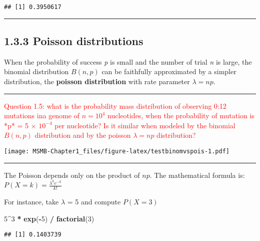 \documentclass[]{article}
\newenvironment{Shaded}{\begin{snugshade}}{\end{snugshade}}
\newcommand{\KeywordTok}[1]{\textcolor[rgb]{0.13,0.29,0.53}{\textbf{#1}}}
\newcommand{\DecValTok}[1]{\textcolor[rgb]{0.00,0.00,0.81}{#1}}
\newcommand{\StringTok}[1]{\textcolor[rgb]{0.31,0.60,0.02}{#1}}
\newcommand{\OperatorTok}[1]{\textcolor[rgb]{0.81,0.36,0.00}{\textbf{#1}}}
\newcommand{\NormalTok}[1]{#1}
\let\oldrule=\rule
\renewcommand{\rule}[1]{\oldrule{\linewidth}}
\begin{document}
\begin{verbatim}
## [1] 0.3950617
\end{verbatim}

\begin{center}\rule{0.5\linewidth}{\linethickness}\end{center}

\subsection{1.3.3 Poisson distributions}\label{poisson-distributions}

When the probability of success \emph{p} is small and the number of
trial \emph{n} is large, the binomial distribution \(B(n, p)\) can be
faithfully approximated by a simpler distribution, the \textbf{poisson
distribution} with rate parameter \(\lambda = np\).

\begin{center}\rule{0.5\linewidth}{\linethickness}\end{center}

\textcolor{red}{Question 1.5: what is the probability mass distribution of observing 0:12 mutations ina  genome of $n = 10^4$ nucleotides, when the probability of mutation is *p* = 5 $\times$ $10^{-4}$ per nucleotide? Is it similar when modeled by the binomial $B(n, p)$ distribution and by the poisson $\lambda = np$ distribution?}

\texttt{[image: MSMB-Chapter1\_files/figure-latex/testbinomvspois-1.pdf]}

\begin{center}\rule{0.5\linewidth}{\linethickness}\end{center}

The Poisson depends only on the product of \(np\). The mathematical
formula is: \(P(X = k) = \frac{\lambda^ke^{-k}}{k!}\)

For instance, take \(\lambda\) = 5 and compute \(P(X = 3)\)

\begin{Shaded}
\begin{Highlighting}[]
\DecValTok{5}\OperatorTok{^}\DecValTok{3} \OperatorTok{*}\StringTok{ }\KeywordTok{exp}\NormalTok{(}\OperatorTok{-}\DecValTok{5}\NormalTok{) }\OperatorTok{/}\StringTok{ }\KeywordTok{factorial}\NormalTok{(}\DecValTok{3}\NormalTok{)}
\end{Highlighting}
\end{Shaded}

\begin{verbatim}
## [1] 0.1403739
\end{verbatim}
\end{document}
